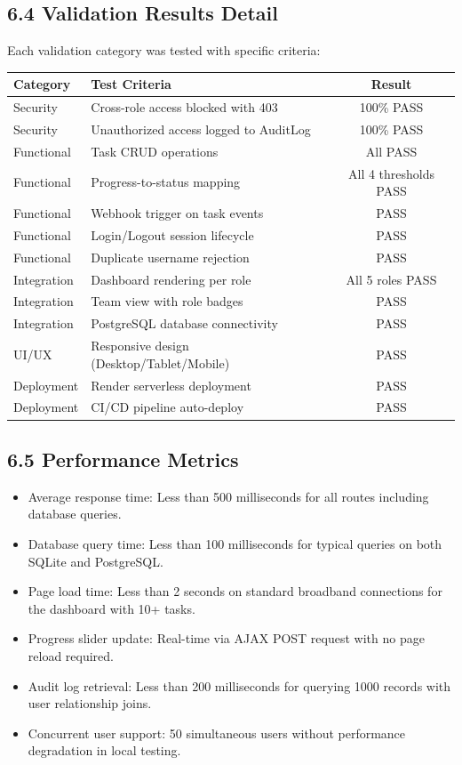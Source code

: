 ﻿\documentclass[12pt]{article}
\begin{document}
\subsection*{6.4 Validation Results Detail}
Each validation category was tested with specific criteria:

\begin{center}
\begin{tabular}{|l|l|c|}
\hline
\textbf{Category} & \textbf{Test Criteria} & \textbf{Result} \\ \hline
Security & Cross-role access blocked with 403 & 100\% PASS \\ \hline
Security & Unauthorized access logged to AuditLog & 100\% PASS \\ \hline
Functional & Task CRUD operations & All PASS \\ \hline
Functional & Progress-to-status mapping & All 4 thresholds PASS \\ \hline
Functional & Webhook trigger on task events & PASS \\ \hline
Functional & Login/Logout session lifecycle & PASS \\ \hline
Functional & Duplicate username rejection & PASS \\ \hline
Integration & Dashboard rendering per role & All 5 roles PASS \\ \hline
Integration & Team view with role badges & PASS \\ \hline
Integration & PostgreSQL database connectivity & PASS \\ \hline
UI/UX & Responsive design (Desktop/Tablet/Mobile) & PASS \\ \hline
Deployment & Render serverless deployment & PASS \\ \hline
Deployment & CI/CD pipeline auto-deploy & PASS \\ \hline
\end{tabular}
\end{center}

\subsection*{6.5 Performance Metrics}
\begin{itemize}
\item Average response time: Less than 500 milliseconds for all routes including database queries.
\item Database query time: Less than 100 milliseconds for typical queries on both SQLite and PostgreSQL.
\item Page load time: Less than 2 seconds on standard broadband connections for the dashboard with 10+ tasks.
\item Progress slider update: Real-time via AJAX POST request with no page reload required.
\item Audit log retrieval: Less than 200 milliseconds for querying 1000 records with user relationship joins.
\item Concurrent user support: 50 simultaneous users without performance degradation in local testing.
\end{itemize}
\end{document}
